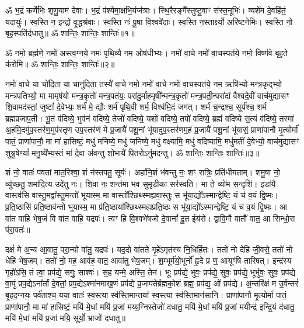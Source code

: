 


ॐ भ॒द्रं कर्णे॑भिः शृणु॒याम॑ देवाः। भ॒द्रं प॑श्येमा॒क्षभि॒र्यज॑त्राः। 
स्थि॒रैरङ्गै᳚स्तुष्टु॒वाꣳ स॑स्त॒नूभिः॑। व्यशे॑म दे॒वहि॑तं॒ यदायुः॑। 
स्व॒स्ति न॒ इन्द्रो॑ वृ॒द्धश्र॑वाः। स्व॒स्ति नः॑ पू॒षा वि॒श्ववे॑दाः। 
स्व॒स्ति न॒स्तार्क्ष्यो॒ अरि॑ष्टनेमिः। स्व॒स्ति नो॒ बृह॒स्पति॑र्दधातु॥
ॐ शान्तिः॒ शान्तिः॒ शान्तिः॑॥१॥


ॐ नमो॒ ब्रह्म॑णे॒ नमो॑ अस्त्व॒ग्नये॒ नमः॑ पृथि॒व्यै नम॒ ओष॑धीभ्यः। नमो॑ वा॒चे नमो॑ वा॒चस्पत॑ये॒ नमो॒ विष्ण॑वे बृह॒ते क॑रोमि॥
ॐ शान्तिः॒ शान्तिः॒ शान्तिः॑॥२॥


नमो॑ वा॒चे या चो॑दि॒ता या चानु॑दिता॒ तस्यै॑ वा॒चे नमो॒ नमो॑ वा॒चे नमो॑ वा॒चस्पत॑ये॒ नम॒ ऋषि॑भ्यो मन्त्र॒कृद्भ्यो॒ मन्त्र॑पतिभ्यो॒ मा मामृष॑यो मन्त्र॒कृतो॑ मन्त्र॒पत॑यः॒ परा॑दु॒र्माहमृषी᳚न्मन्त्र॒कृतो॑ मन्त्र॒पती॒न्परा॑दां वैश्वदे॒वीं वाच॑मुद्यासꣳ शि॒वामद॑स्तां॒ जुष्टां᳚ दे॒वेभ्यः॒ शर्म॑ मे॒ द्यौः  शर्म॑ पृथि॒वी शर्म॒ विश्व॑मि॒दं जग॑त्। शर्म॑ च॒न्द्रश्च॒ सूर्य॑श्च॒ शर्म॑ ब्रह्मप्रजाप॒ती। भू॒तं व॑दिष्ये॒ भुव॑नं वदिष्ये॒ तेजो॑ वदिष्ये॒ यशो॑ वदिष्ये॒ तपो॑ वदिष्ये॒ ब्रह्म॑ वदिष्ये स॒त्यं व॑दिष्ये॒ तस्मा॑ अ॒हमि॒दमु॑प॒स्तर॑ण॒मुप॑स्तृण उप॒स्तर॑णं मे प्र॒जायै॑ पशू॒नां भू॑यादुप॒स्तर॑णम॒हं प्र॒जायै॑ पशू॒नां भू॑यासं॒ प्राणा॑पानौ मृ॒त्योर्मा॑ पातं॒ प्राणा॑पानौ॒ मा मा॑ हासिष्टं॒ मधु॑ मनिष्ये॒ मधु॑ जनिष्ये॒ मधु॑ वक्ष्यामि॒ मधु॑ वदिष्यामि॒ मधु॑मतीं दे॒वेभ्यो॒ वाच॑मुद्यासꣳ शुश्रू॒षेण्यां᳚ मनु॒ष्ये᳚भ्य॒स्तं मा॑ दे॒वा अ॑वन्तु शो॒भायै॑ पि॒तरोऽनु॑मदन्तु। ॐ शान्तिः॒ शान्तिः॒ शान्तिः॑॥३॥

शं नो॒ वातः॑ पवतां मात॒रिश्वा॒ शं न॑स्तपतु॒ सूर्यः॑। अहा॑नि॒शं भ॑वन्तु नः॒ शꣳ रात्रिः॒ प्रति॑धीयताम्। शमु॒षा नो॒ व्यु॑च्छतु॒ शमा॑दि॒त्य उदे॑तु नः। शि॒वा नः॒ शन्त॑मा भव सुमृडी॒का सर॑स्वति। मा ते॒ व्यो॑म स॒न्दृशि॑। इडा॑यै॒ वास्त्व॑सि वास्तु॒मद्वा᳚स्तु॒मन्तो॑ भूयास्म॒ मा वास्तो᳚श्छिथ्स्मह्यवा॒स्तुः स भू॑या॒द्यो᳚ऽस्मान्द्वेष्टि॒ यं च॑ व॒यं द्वि॒ष्मः। प्र॒ति॒ष्ठासि॑ प्रति॒ष्ठाव॑न्तो भूयास्म॒ मा प्र॑ति॒ष्ठाया᳚श्छिथ्स्मह्यप्रति॒ष्ठः स भू॑या॒द्यो᳚ऽस्मान्द्वेष्टि॒ यं च॑ व॒यं द्वि॒ष्मः। आ वा॑त वाहि भेष॒जं वि वा॑त वाहि॒ यद्रपः॑। त्वꣳ हि वि॒श्वभे॑षजो दे॒वानां᳚ दू॒त ईय॑से। द्वावि॒मौ वातौ॑ वात॒ आ सिन्धो॒रा प॑रा॒वतः॑॥

दक्षं॑ मे अ॒न्य आ॒वातु॒ परा॒न्यो वा॑तु॒ यद्रपः॑। यद॒दो वा॑तते गृ॒हे॑ऽमृत॑स्य नि॒धिर्\mbox{}हि॒तः। ततो॑ नो देहि जी॒वसे॒ ततो॑ नो धेहि भेष॒जम्। ततो॑ नो॒ मह॒ आव॑ह॒ वात॒ आवा॑तु भेष॒जम्। श॒म्भूर्म॑यो॒भूर्नो॑ हृ॒दे प्र ण॒ आयूꣳ॑षि तारिषत्। इन्द्र॑स्य गृ॒हो॑ऽसि॒ तं त्वा॒ प्रप॑द्ये॒ सगुः॒ साश्वः॑। स॒ह यन्मे॒ अस्ति॒ तेन॑। भूः प्रप॑द्ये॒ भुवः॒ प्रप॑द्ये॒ सुवः॒ प्रप॑द्ये॒ भूर्भुवः॒ सुवः॒ प्रप॑द्ये वा॒युं प्रप॒द्येऽना᳚र्तां दे॒वतां॒ प्रप॒द्येऽश्मा॑नमाख॒णं प्रप॑द्ये प्र॒जाप॑तेर्ब्रह्मको॒शं ब्रह्म॒ प्रप॑द्य॒ ओं प्रप॑द्ये। अ॒न्तरि॑क्षं म उ॒र्व॑न्तरं॑ बृ॒हद॒ग्नयः॒ पर्व॑ताश्च॒ यया॒ वातः॑ स्व॒स्त्या स्व॑स्ति॒मान्तया᳚ स्व॒स्त्या स्व॑स्ति॒मान॑सानि। प्राणा॑पानौ मृ॒त्योर्मा॑ पातं॒ प्राणा॑पानौ॒ मा मा॑ हासिष्टं॒ मयि॑ मे॒धां मयि॑ प्र॒जां मय्य॒ग्निस्तेजो॑ दधातु॒ मयि॑ मे॒धां मयि॑ प्र॒जां मयीन्द्र॑ इन्द्रि॒यं द॑धातु॒ मयि॑ मे॒धां मयि॑ प्र॒जां मयि॒ सूर्यो॒ भ्राजो॑ दधातु॥

